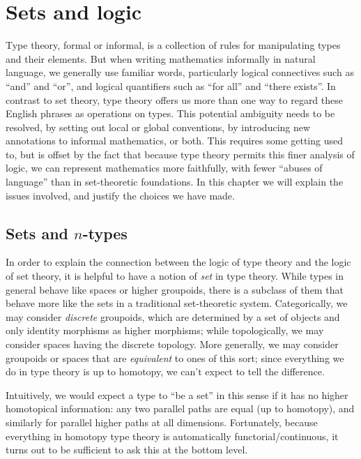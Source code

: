 \chapter{Sets and logic}
\label{cha:logic}

Type theory, formal or informal, is a collection of rules for manipulating types and their elements.
But when writing mathematics informally in natural language, we generally use familiar words, particularly logical connectives such as ``and'' and ``or'', and logical quantifiers such as ``for all'' and ``there exists''.
In contrast to set theory, type theory offers us more than one way to regard these English phrases as operations on types.
This potential ambiguity needs to be resolved, by setting out local or global conventions, by introducing new annotations to informal mathematics, or both.
This requires some getting used to, but is offset by the fact that because type theory permits this finer analysis of logic, we can represent mathematics more faithfully, with fewer ``abuses of language'' than in set-theoretic foundations.
In this chapter we will explain the issues involved, and justify the choices we have made.

\section{Sets and \texorpdfstring{$n$}{n}-types}
\label{sec:basics-sets}

%

In order to explain the connection between the logic of type theory and the logic of set theory, it is helpful to have a notion of \emph{set} in type theory.
While types in general behave like spaces or higher groupoids, there is a subclass of them that behave more like the sets in a traditional set-theoretic system.
Categorically, we may consider \emph{discrete} groupoids, which are determined by a set of objects and only identity morphisms as higher morphisms; while topologically, we may consider spaces having the discrete topology.
More generally, we may consider groupoids or spaces that are \emph{equivalent} to ones of this sort; since everything we do in type theory is up to homotopy, we can't expect to tell the difference.

Intuitively, we would expect a type to ``be a set'' in this sense if it has no higher homotopical information: any two parallel paths are equal (up to homotopy), and similarly for parallel higher paths at all dimensions.
Fortunately, because everything in homotopy type theory is automatically functorial/continuous,
%
%
it turns out to be sufficient to ask this at the bottom level.

